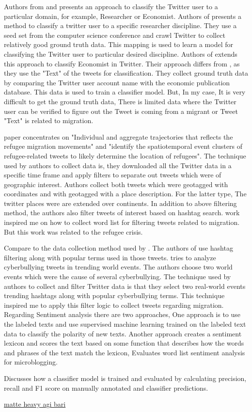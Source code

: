  
Authors from \cite{Hadgu} and  \cite{Böhm2017} presents an approach to classify the Twitter user to a particular domain, for example, Researcher or Economist. Authors of \cite{Hadgu} presents a method to classify a twitter user to a specific researcher discipline. They use a seed set from the computer science conference and crawl Twitter to collect relatively good ground truth data. This mapping is used to learn a model for classifying the Twitter user to particular desired discipline. Authors of \cite{Böhm2017}  extends this approach to classify Economist in Twitter. Their approach differs from \cite{Hadgu}, as they use the "Text" of the tweets for classification. They collect ground truth data by comparing the Twitter user account name with the economic publication database. This data is used to train a classifier model. But, In my case, It is very difficult to get the ground truth data, There is limited data where the Twitter user can be verified to figure out the Tweet is coming from a migrant or Tweet "Text" is related to migration. 
 
\cite{Hübl} paper concentrates on "Individual and aggregate trajectories that reflects the refugee migration
movements" and "identify the spatiotemporal event clusters of refugee-related tweets to
likely determine the location of refugees". The technique used by authors to collect data is, they
downloaded all the Twitter data in a specific time frame and apply filters to separate out tweets
which were of geographic interest. Authors collect both tweets which were geotagged with coordinates
and with geotagged with a place description. For the latter type, The twitter places were
are extended over continents. In addition to above filtering method, the authors also filter tweets
of interest based on hashtag search. \cite{Hübl} work inspired me on how to collect word list for filtering
tweets related to migration. But this work was related to the refugee crisis.
 
Compare to the data collection method used by \cite{Hübl}. The authors of \cite{Cortis} use hashtag filtering
along with popular terms used in those tweets. \cite{Cortis} tries to analyze cyberbullying tweets in trending
world events. The authors choose two world events which were the cause of several cyberbullying.
The technique used by authors to collect and filter Twitter data is that they select two real-world
events trending hashtags along with popular cyberbullying terms. This technique inspired me to
apply this filter logic to collect tweets regarding migration.
Regarding Sentiment analysis there are two approaches, One approach is to use the labeled
texts and use supervised machine learning trained on the labeled text data to classify the polarity
of new texts. Another approach creates a sentiment lexicon and scores the text based on some
function that describes how the words and phrases of the text match the lexicon, \cite{DBLP} Evaluates
word list sentiment analysis for microblogging.

 \cite{Jamie} Discusses how a classifier model is trained
and evaluated by calculating precision, recall and F1 score on manually annotated and classifier
predictions.


 \underline{matte heavy agi bari}
